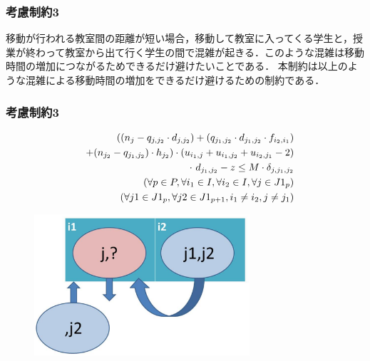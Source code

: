 \documentclass[dvipdfmx,12pt]{beamer}
\begin{document}
\begin{frame}

  \frametitle{\LARGE 考慮制約3}


\vspace{5.0mm}


移動が行われる教室間の距離が短い場合，移動して教室に入ってくる学生と，授業が終わって教室から出て行く学生の間で混雑が起きる．このような混雑は移動時間の増加につながるためできるだけ避けたいことである．
本制約は以上のような混雑による移動時間の増加をできるだけ避けるための制約である．

\end{frame}
\begin{frame}

  \frametitle{\LARGE 考慮制約3}
\vspace{-10.0mm}
{\Large
\begin{eqnarray}
&&((n_{j}-q_{j,j_2}\cdot d_{j,j_2}) + (q_{j_1,j_2} \cdot d_{j_1,j_2} \cdot f_{i_2,i_1}) \nonumber \\
&&+ (n_{j_2} - q_{j_1,j_2}) \cdot h_{j_2}) \cdot (u_{i_1,j} + u_{i_1,j_2} + u_{i_2,j_1} - 2) \nonumber\\
&& \cdot \ d_{j_1,j_2} - z \leq M \cdot \delta_{j,j_1,j_2} \\
&& \hspace{10.0mm} \left(\forall p \in P,\forall i_1 \in I,\forall i_2 \in I,\forall j \in J1_{p}\right)\nonumber\\
&& \hspace{10.0mm} \left(\forall j1 \in J1_{p},\forall j2 \in J1_{p+1},i_1 \neq i_2,j \neq j_1\right)\nonumber 
\end{eqnarray}
}
\vspace{-8.0mm}
\begin{figure}[H]
 \begin{center}
  \includegraphics[width=80mm]{soturon_pre7.eps}
 \end{center}
\end{figure}
\end{frame}
\end{document}
